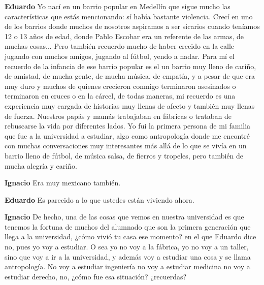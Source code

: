 \documentclass[
  spanish,
  11pt,
  a4paper,
]{scrbook}
\newenvironment{transcripcion}{
    \begin{list}{}{
        \setlength{\leftmargin}{1.5em}  %
        \setlength{\rightmargin}{0em}
        \setlength{\itemsep}{0.2em}     %
        \setlength{\parsep}{0.0em}
        \setlength{\listparindent}{0pt}
    }
}{
    \end{list}
}
\newcommand{\personaje}[1]{\textbf{#1}\quad}
\begin{document}
\begin{transcripcion}
\item \personaje{Eduardo} Yo nací en un barrio popular en Medellín que sigue mucho las características que estás mencionando: sí había bastante violencia. Crecí en uno de los barrios donde muchos de nosotros aspiramos a ser sicarios cuando teníamos 12 o 13 años de edad, donde Pablo Escobar era un referente de las armas, de muchas cosas... Pero también recuerdo mucho de haber crecido en la calle jugando con muchos amigos, jugando al fútbol, yendo a nadar. Para mí el recuerdo de la infancia de ese barrio popular es el un barrio muy lleno de cariño, de amistad, de mucha gente, de mucha música, de empatía, y a pesar de que era muy duro y muchos de quienes crecieron conmigo terminaron asesinados o terminaron en cruces o en la cárcel, de todas maneras, mi recuerdo es una experiencia muy cargada de historias muy llenas de afecto y también muy llenas de fuerza. Nuestros papás y mamás trabajaban en fábricas o trataban de rebuscarse la vida por diferentes lados. Yo fui la primera persona de mi familia que fue a la universidad a estudiar, algo como antropología donde me encontré con muchas conversaciones muy interesantes más allá de lo que se vivía en un barrio lleno de fútbol, de música salsa, de fierros y tropeles, pero también de mucha alegría y cariño.

\item \personaje{Ignacio} Era muy mexicano también.

\item \personaje{Eduardo} Es parecido a lo que ustedes están viviendo ahora.

\item \personaje{Ignacio} De hecho, una de las cosas que vemos en nuestra universidad es que tenemos la fortuna de muchos del alumnado que son la primera generación que llega a la universidad, ¿cómo vivió tu casa ese momento? en el que Eduardo dice no, pues yo voy a estudiar. O sea yo no voy a la fábrica, yo no voy a un taller, sino que voy a ir a la universidad, y además voy a estudiar una cosa y se llama antropología. No voy a estudiar ingeniería no voy a estudiar medicina no voy a estudiar derecho, no, ¿cómo fue esa situación? ¿recuerdas?


\end{transcripcion}
\end{document}
